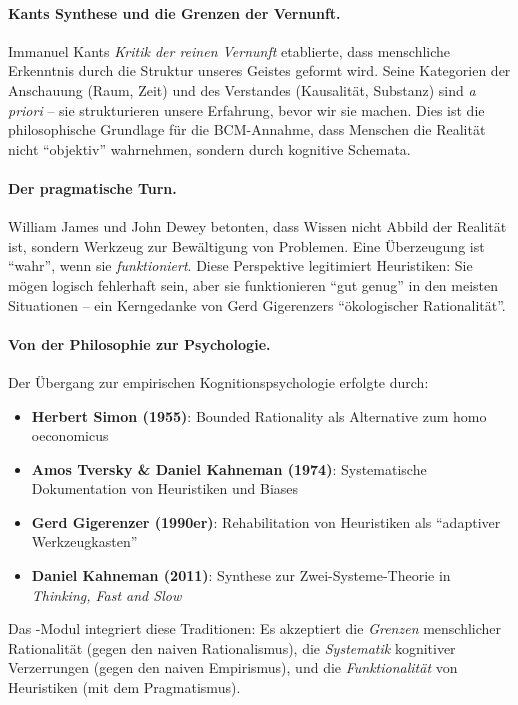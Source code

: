 \paragraph{Kants Synthese und die Grenzen der Vernunft.}
Immanuel Kants \textit{Kritik der reinen Vernunft} etablierte, dass menschliche Erkenntnis durch die Struktur unseres Geistes geformt wird. Seine Kategorien der Anschauung (Raum, Zeit) und des Verstandes (Kausalität, Substanz) sind \textit{a priori} -- sie strukturieren unsere Erfahrung, bevor wir sie machen. Dies ist die philosophische Grundlage für die BCM-Annahme, dass Menschen die Realität nicht ``objektiv'' wahrnehmen, sondern durch kognitive Schemata.

\paragraph{Der pragmatische Turn.}
William James und John Dewey betonten, dass Wissen nicht Abbild der Realität ist, sondern Werkzeug zur Bewältigung von Problemen. Eine Überzeugung ist ``wahr'', wenn sie \textit{funktioniert}. Diese Perspektive legitimiert Heuristiken: Sie mögen logisch fehlerhaft sein, aber sie funktionieren ``gut genug'' in den meisten Situationen -- ein Kerngedanke von Gerd Gigerenzers ``ökologischer Rationalität''.

\paragraph{Von der Philosophie zur Psychologie.}
Der Übergang zur empirischen Kognitionspsychologie erfolgte durch:
\begin{itemize}
    \item \textbf{Herbert Simon (1955)}: Bounded Rationality als Alternative zum homo oeconomicus
    \item \textbf{Amos Tversky \& Daniel Kahneman (1974)}: Systematische Dokumentation von Heuristiken und Biases
    \item \textbf{Gerd Gigerenzer (1990er)}: Rehabilitation von Heuristiken als ``adaptiver Werkzeugkasten''
    \item \textbf{Daniel Kahneman (2011)}: Synthese zur Zwei-Systeme-Theorie in \textit{Thinking, Fast and Slow}
\end{itemize}

Das \META-Modul integriert diese Traditionen: Es akzeptiert die \textit{Grenzen} menschlicher Rationalität (gegen den naiven Rationalismus), die \textit{Systematik} kognitiver Verzerrungen (gegen den naiven Empirismus), und die \textit{Funktionalität} von Heuristiken (mit dem Pragmatismus).

